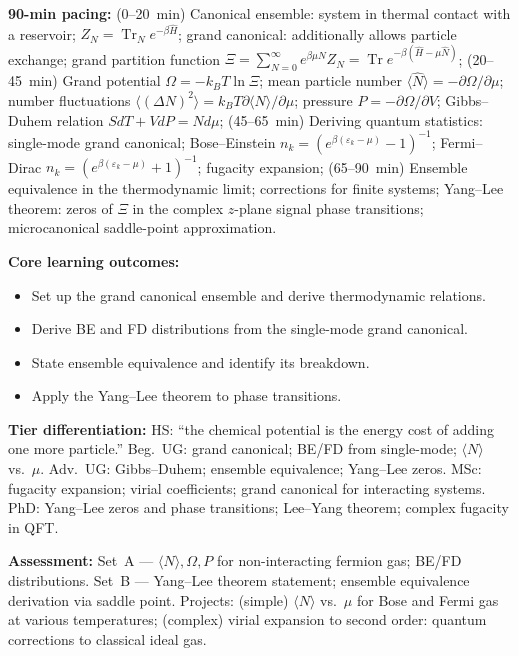 \documentclass[11pt,a4paper]{article}
\begin{document}
\begin{tcolorbox}[modulebox, title={Module~II.7 / L02: Canonical and Grand-Canonical Ensembles}]
\textbf{90-min pacing:} (0--20~min) Canonical ensemble: system in thermal contact with a reservoir; $Z_N=\operatorname{Tr}_Ne^{-\beta\hat{H}}$; grand canonical: additionally allows particle exchange; grand partition function $\Xi=\sum_{N=0}^\infty e^{\beta\mu N}Z_N=\operatorname{Tr}e^{-\beta(\hat{H}-\mu\hat{N})}$; (20--45~min) Grand potential $\Omega=-k_BT\ln\Xi$; mean particle number $\langle\hat{N}\rangle=-\partial\Omega/\partial\mu$; number fluctuations $\langle(\Delta N)^2\rangle=k_BT\partial\langle N\rangle/\partial\mu$; pressure $P=-\partial\Omega/\partial V$; Gibbs--Duhem relation $SdT+Vd P=Nd\mu$; (45--65~min) Deriving quantum statistics: single-mode grand canonical; Bose--Einstein $n_k=(e^{\beta(\varepsilon_k-\mu)}-1)^{-1}$; Fermi--Dirac $n_k=(e^{\beta(\varepsilon_k-\mu)}+1)^{-1}$; fugacity expansion; (65--90~min) Ensemble equivalence in the thermodynamic limit; corrections for finite systems; Yang--Lee theorem: zeros of $\Xi$ in the complex $z$-plane signal phase transitions; microcanonical saddle-point approximation.

\medskip\textbf{Core learning outcomes:}
\begin{itemize}[leftmargin=1.4em,topsep=2pt,itemsep=1pt]
  \item Set up the grand canonical ensemble and derive thermodynamic relations.
  \item Derive BE and FD distributions from the single-mode grand canonical.
  \item State ensemble equivalence and identify its breakdown.
  \item Apply the Yang--Lee theorem to phase transitions.
\end{itemize}

\medskip\textbf{Tier differentiation:}
HS: ``the chemical potential is the energy cost of adding one more particle.''
Beg.\ UG: grand canonical; BE/FD from single-mode; $\langle N\rangle$ vs.\ $\mu$.
Adv.\ UG: Gibbs--Duhem; ensemble equivalence; Yang--Lee zeros.
MSc: fugacity expansion; virial coefficients; grand canonical for interacting systems.
PhD: Yang--Lee zeros and phase transitions; Lee--Yang theorem; complex fugacity in QFT.

\medskip\textbf{Assessment:}
Set~A --- $\langle N\rangle,\Omega,P$ for non-interacting fermion gas; BE/FD distributions.
Set~B --- Yang--Lee theorem statement; ensemble equivalence derivation via saddle point.
Projects: (simple) $\langle N\rangle$ vs.\ $\mu$ for Bose and Fermi gas at various temperatures;
(complex) virial expansion to second order: quantum corrections to classical ideal gas.
\end{tcolorbox}
\end{document}
